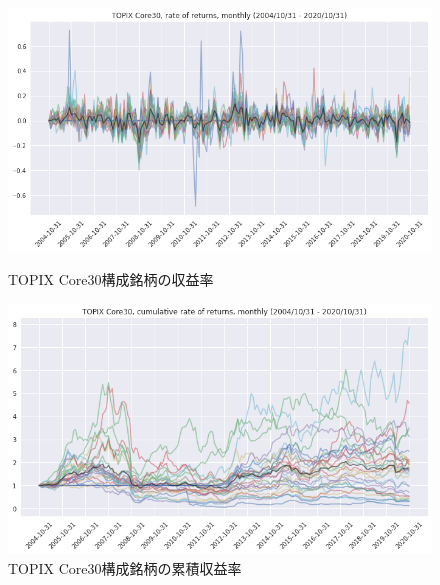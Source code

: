 \documentclass[dvipdfmx,autodetect-engine]{jsarticle}
\begin{document}
\begin{figure}[htbp]
    \begin{minipage}{0.5\hsize}
        \begin{center}
            \includegraphics[width=1.0\hsize]{./figures/topixcore30_chg_20041031-20201031.png}
            \caption{TOPIX Core30構成銘柄の収益率}
            \label{fig:one}
        \end{center}
    \end{minipage}
    \begin{minipage}{0.5\hsize}
        \begin{center}
            \includegraphics[width=1.0\hsize]{./figures/topixcore30_cum_20041031-20201031.png}
            \caption{TOPIX Core30構成銘柄の累積収益率}
            \label{fig:two}
        \end{center}
    \end{minipage}
\end{figure}
\end{document}
